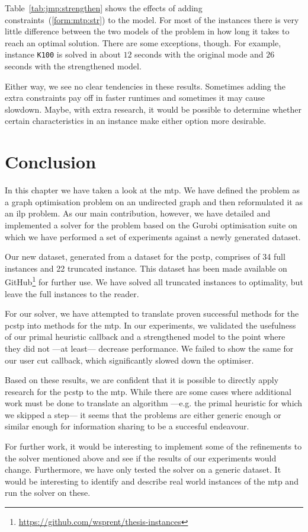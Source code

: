 Table~\ref{tab:jmp:strengthen} shows the effects of adding constraints~(\ref{form:mtp:str}) to
the model. For most of the instances there is very little difference between the two models
of the problem in how long it takes to reach an optimal solution. There are some exceptions, though.
For example, instance \texttt{K100} is solved in about $12$ seconds with the original mode and
$26$ seconds with the strengthened model.

Either way, we see no clear tendencies in these results. Sometimes adding the extra constraints
pay off in faster runtimes and sometimes it may cause slowdown. Maybe, with extra research, it
would be possible to determine whether certain characteristics in an instance make either option
more desirable.

\section{Conclusion}
In this chapter we have taken a look at the \acrlong{mtp}. We have defined the problem as
a graph optimisation problem on an undirected graph and then reformulated it as an \gls{ilp}
problem. As our main contribution, however, we have detailed and implemented a solver for the
problem based on the Gurobi optimisation suite on which we have performed a set of experiments
against a newly generated dataset.

Our new dataset, generated from a dataset for the \gls{pcstp}, comprises of 34 full instances
and 22 truncated instance. This dataset
has been made available on
GitHub\footnote{\url{https://github.com/wsprent/thesis-instances}}
for further use. We have solved all truncated instances to
optimality, but leave the full instances to the reader.

For our solver, we have attempted to translate proven successful methods for the \gls{pcstp}
into methods for
the \gls{mtp}.
In our experiments, we validated the usefulness of our primal heuristic callback and
a strengthened model to the point where they did not
---at least---
decrease performance.
We failed to show the same for our user cut callback, which significantly slowed down the
optimiser.

Based on these results, we are confident that it is possible to directly apply research for
the \gls{pcstp} to the \gls{mtp}. While there are some cases where additional work must be
done to translate an algorithm ---e.g. the primal heuristic for which we skipped a step---
it seems that the problems are either generic enough or similar enough for information sharing
to be a succesful endeavour.

For further work, it would be interesting to implement some of the refinements to the solver
mentioned above and see if the results of our experiments would change. Furthermore, we have
only tested the solver on a generic dataset. It would be interesting to identify and describe
real world instances of the \gls{mtp} and run the solver on these.


